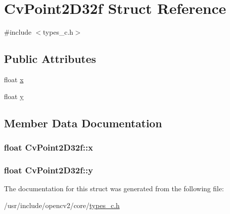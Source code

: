 \hypertarget{structCvPoint2D32f}{\section{Cv\-Point2\-D32f Struct Reference}
\label{structCvPoint2D32f}
}


{\ttfamily \#include $<$types\-\_\-c.\-h$>$}

\subsection*{Public Attributes}
\begin{DoxyCompactItemize}
\item 
float \hyperlink{structCvPoint2D32f_a8d77880e3d92682aec3cbb36eae9cc40}{x}
\item 
float \hyperlink{structCvPoint2D32f_afaec75e4e30df5f2e3ab02c46dae0cb0}{y}
\end{DoxyCompactItemize}


\subsection{Member Data Documentation}
\hypertarget{structCvPoint2D32f_a8d77880e3d92682aec3cbb36eae9cc40}{
\subsubsection[{x}]{\setlength{\rightskip}{0pt plus 5cm}float Cv\-Point2\-D32f\-::x}}\label{structCvPoint2D32f_a8d77880e3d92682aec3cbb36eae9cc40}
\hypertarget{structCvPoint2D32f_afaec75e4e30df5f2e3ab02c46dae0cb0}{
\subsubsection[{y}]{\setlength{\rightskip}{0pt plus 5cm}float Cv\-Point2\-D32f\-::y}}\label{structCvPoint2D32f_afaec75e4e30df5f2e3ab02c46dae0cb0}


The documentation for this struct was generated from the following file\-:\begin{DoxyCompactItemize}
\item 
/usr/include/opencv2/core/\hyperlink{core_2types__c_8h}{types\-\_\-c.\-h}\end{DoxyCompactItemize}
